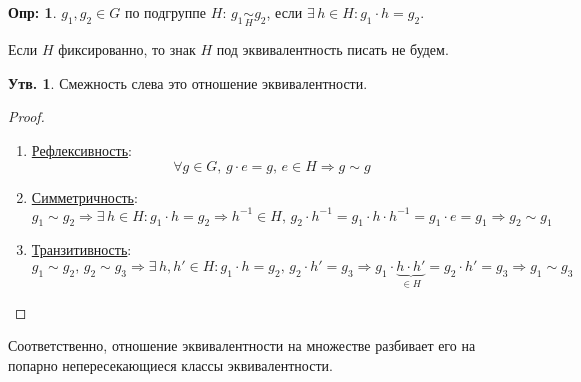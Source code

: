 \documentclass[12pt]{article}
\theoremstyle{definition}
\newtheorem{defn}{Опр:}
\newtheorem{prop}{Утв.}
\begin{document}
\begin{defn}
	 $g_1,g_2 \in G$ по подгруппе $H$: $g_1 \underset{H}{\sim} g_2$, если $\exists \, h \in H \colon g_1{\cdot}h = g_2$.
\end{defn}
Если $H$ фиксированно, то знак $H$ под эквивалентность писать не будем.
\begin{prop}
	Смежность слева это отношение эквивалентности.
\end{prop}
\begin{proof}\hfill
	\begin{enumerate}[label=\arabic*)]
		\item \uline{Рефлексивность}: 
		$$
			\forall g \in G, \, g{\cdot}e = g, \, e \in H \Rightarrow g \sim g
		$$
		\item \uline{Симметричность}: 
		$$
			g_1 \sim g_2 \Rightarrow \exists \, h \in H \colon g_1{\cdot}h = g_2 \Rightarrow h^{-1}\in H, \, g_2{\cdot}h^{-1} = g_1{\cdot}h{\cdot}h^{-1} = g_1{\cdot}e = g_1 \Rightarrow g_2 \sim g_1
		$$
		\item \uline{Транзитивность}: 
		$$
			g_1 \sim g_2, \, g_2 \sim g_3 \Rightarrow \exists  \, h,h' \in H \colon g_1{\cdot}h = g_2, \, g_2{\cdot}h' = g_3 \Rightarrow g_1{\cdot}\underbrace{h{\cdot}h'}_{\in H} = g_2{\cdot}h' = g_3 \Rightarrow g_1 \sim g_3
		$$
 	\end{enumerate}
\end{proof}
Соответственно, отношение эквивалентности на множестве разбивает его на попарно непересекающиеся классы эквивалентности.
\end{document}
